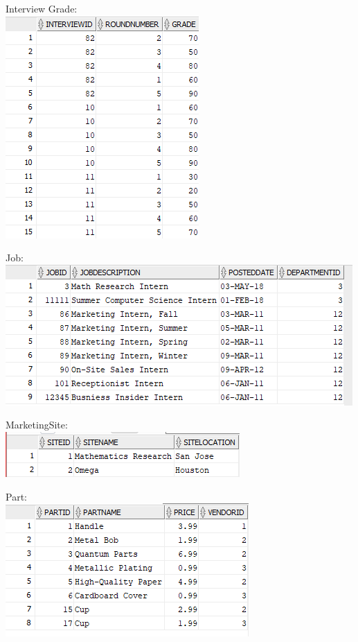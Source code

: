 \documentclass[12pt]{article}
\begin{document}
\begin{enumerate}
		\begin{center}
				Interview Grade:\\
				\includegraphics[scale=1.5]{completed_diags/states/Interview_grade}
		\end{center}
		\begin{center}
				Job:\\
				\includegraphics[scale=1.0]{completed_diags/states/Job}
		\end{center}
		\begin{center}
				MarketingSite:\\
				\includegraphics[scale=1.5]{completed_diags/states/MarketingSite}
		\end{center}
		\begin{center}
				Part:\\
				\includegraphics[scale=1.5]{completed_diags/states/Part}

\end{center}
\end{enumerate}
\end{document}
